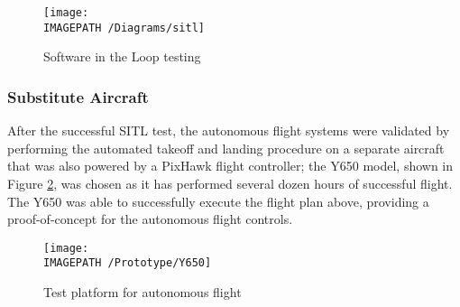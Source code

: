 \begin{figure}[H]
	\centering
	\texttt{[image: \\IMAGEPATH /Diagrams/sitl]}
	\caption{Software in the Loop testing}
	\label{fig:sitl}
\end{figure}

\subsubsection*{Substitute Aircraft}
After the successful SITL test, the autonomous flight systems were validated by performing the automated takeoff and landing procedure on a separate aircraft that was also powered by a PixHawk flight controller; the Y650 model, shown in Figure \ref{fig:Y650}, was chosen as it has performed several dozen hours of successful flight. The Y650 was able to successfully execute the flight plan above, providing a proof-of-concept for the autonomous flight controls.

\begin{figure}[H]
	\centering
	\texttt{[image: \\IMAGEPATH /Prototype/Y650]}
 	\caption{Test platform for autonomous flight}
 	\label{fig:Y650}
\end{figure}